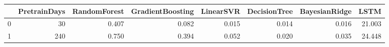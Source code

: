 \begin{tabular}{lrrrrrrr}
\toprule
{} &  PretrainDays &  RandomForest &  GradientBoosting &  LinearSVR &  DecisionTree &  BayesianRidge &    LSTM \\
\midrule
0 &            30 &         0.407 &             0.082 &      0.015 &         0.014 &          0.016 &  21.003 \\
1 &           240 &         0.750 &             0.394 &      0.052 &         0.020 &          0.035 &  24.448 \\
\bottomrule
\end{tabular}
